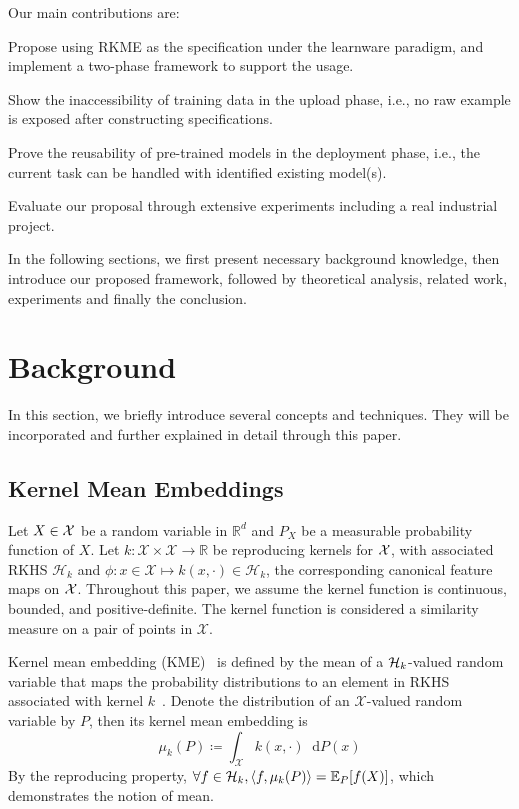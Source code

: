 \documentclass[paper=letter, fontsize=20pt]{article}
\newcommand*\diff{\mathop{}\!\mathrm{d}}
\begin{document}
Our main contributions are:
\begin{compactitem}
\item Propose using RKME as the specification under the learnware paradigm, and implement a two-phase framework to support the usage.
\item Show the inaccessibility of training data in the upload phase, i.e., no raw example is exposed after constructing specifications. 
\item Prove the reusability of pre-trained models in the deployment phase, i.e., the current task can be handled with identified existing model(s).
\item Evaluate our proposal through extensive experiments including a real industrial project.
\end{compactitem}

In the following sections, we first present  necessary background knowledge, then introduce our proposed framework, followed by theoretical analysis, related work, experiments and finally the conclusion.

\section{Background} \label{sec:background}
In this section, we briefly introduce several concepts and techniques. They will be incorporated and further explained in detail through this paper.

\subsection{Kernel Mean Embeddings}
Let $X \in \mathcal{X}$ be a random variable in $\mathbb{R}^d$ and $P_X$ be a measurable probability function of $X$. Let $k:\mathcal{X}\times\mathcal{X}\rightarrow\mathbb{R}$ be reproducing kernels for $\mathcal{X}$, with associated RKHS $\mathcal{H}_k$ and $\phi:x\in\mathcal{X}\mapsto k(x,\cdot)\in\mathcal{H}_k$,
the corresponding canonical feature maps on $\mathcal{X}$. Throughout this paper, we assume the kernel function is continuous, bounded, and positive-definite. The kernel function is considered a similarity measure on a pair of points in $\mathcal{X}$.

Kernel mean embedding (KME)~\citep{Smola07KME} is defined by the mean of a $\mathcal{H}_k$-valued random variable that maps the probability distributions to an element in RKHS associated with kernel $k$~\citep{Learning_with_Kernels}. Denote the distribution of an $\mathcal{X}$-valued random variable by $P$, then its kernel mean embedding is
\begin{equation}\label{eq:KME_def}
    \mu_k(P)\coloneqq \int_\mathcal{X} k(x,\cdot)\diff P(x)
\end{equation}
By the reproducing property, $\forall f\in \mathcal{H}_{k}, \langle f, \mu_k(P)\rangle = \mathbb{E}_{P}[f(X)]$, which demonstrates the notion of mean.
\end{document}
